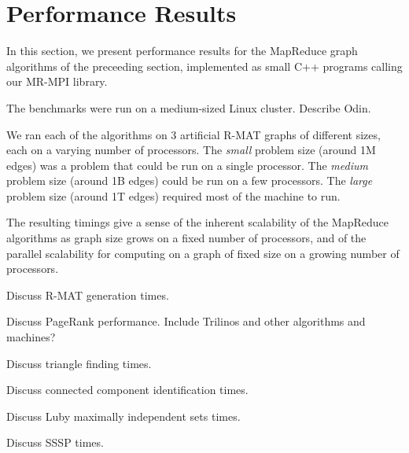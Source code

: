 \section{Performance Results}
\label{sec:results}

In this section, we present performance results for the MapReduce
graph algorithms of the preceeding section, implemented as small C++
programs calling our MR-MPI library.

The benchmarks were run on a medium-sized Linux cluster.  Describe
Odin.

We ran each of the algorithms on 3 artificial R-MAT graphs of
different sizes, each on a varying number of processors.  The {\it
small} problem size (around 1M edges) was a problem that could be run
on a single processor.  The {\it medium} problem size (around 1B
edges) could be run on a few processors.  The {\it large} problem size
(around 1T edges) required most of the machine to run.

The resulting timings give a sense of the inherent scalability of the
MapReduce algorithms as graph size grows on a fixed number of
processors, and of the parallel scalability for computing on a graph
of fixed size on a growing number of processors.

Discuss R-MAT generation times.

Discuss PageRank performance.  Include Trilinos and other
algorithms and machines?

Discuss triangle finding times.

Discuss connected component identification times.

Discuss Luby maximally independent sets times.

Discuss SSSP times.
